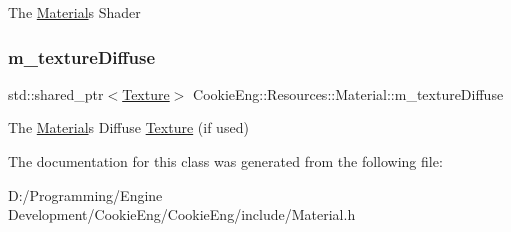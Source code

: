 The \hyperlink{class_cookie_eng_1_1_resources_1_1_material}{Material}\textquotesingle{}s Shader \mbox{\label{class_cookie_eng_1_1_resources_1_1_material_adf7fcbb59dcfbad47d48052522414791}} 
\subsubsection{\texorpdfstring{m\+\_\+texture\+Diffuse}{m\_textureDiffuse}}
{\footnotesize\ttfamily std\+::shared\+\_\+ptr$<$\hyperlink{class_cookie_eng_1_1_resources_1_1_texture}{Texture}$>$ Cookie\+Eng\+::\+Resources\+::\+Material\+::m\+\_\+texture\+Diffuse\hspace{0.3cm}{\ttfamily [protected]}}

The \hyperlink{class_cookie_eng_1_1_resources_1_1_material}{Material}\textquotesingle{}s Diffuse \hyperlink{class_cookie_eng_1_1_resources_1_1_texture}{Texture} (if used) 

The documentation for this class was generated from the following file\+:\begin{DoxyCompactItemize}
\item 
D\+:/\+Programming/\+Engine Development/\+Cookie\+Eng/\+Cookie\+Eng/include/Material.\+h\end{DoxyCompactItemize}
